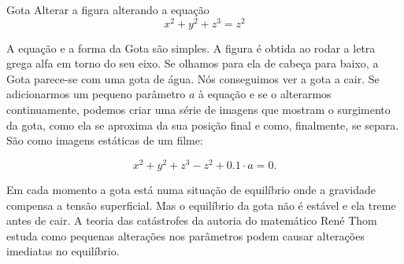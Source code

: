 \begin{surferPage}{Gota}
Alterar a figura alterando a equa\c c\~ao\\

\smallskip
\[x^2	+ y^2	+ z^3	= z^2\]

\singlespacing
A equa\c c\~ao e a forma da Gota s\~ao simples. A figura \'e obtida ao rodar a letra grega alfa em torno do seu eixo. Se  olhamos para ela de cabe\c ca para baixo, a Gota parece-se com uma gota de \'agua. N\'os conseguimos ver a gota a cair.
\newline
Se adicionarmos um pequeno par\^ametro $a$ \`a equa\c c\~ao e se o alterarmos continuamente, podemos criar uma s\'erie de imagens que mostram o surgimento da gota, como ela se aproxima da sua posi\c c\~ao final e como, finalmente, se separa. S\~ao como imagens est\'aticas de um filme:

\[x^2	+ y^2	+ z^3	-z^2+0.1\cdot a=0.\]

Em cada momento a gota est\'a numa situa\c c\~ao de equil\'ibrio onde a gravidade compensa a tens\~ao superficial. Mas o equil\'ibrio da gota n\~ao \'e est\'avel e ela treme antes de cair. A teoria das cat\'astrofes da autoria do matem\'atico Ren\'e Thom estuda como pequenas altera\c c\~oes nos par\^ametros podem causar altera\c c\~oes imediatas no equil\'ibrio.
\end{surferPage}
